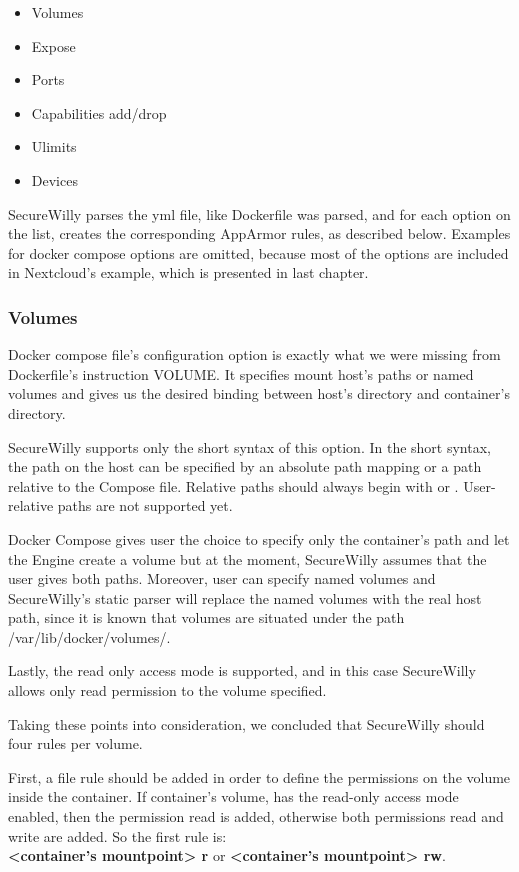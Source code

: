 \begin{itemize}
\item Volumes
\item Expose
\item Ports
\item Capabilities add/drop
\item Ulimits
\item Devices
\end{itemize}

SecureWilly parses the yml file, like Dockerfile was parsed, and for each option on the list, creates the corresponding AppArmor rules, as described below. Examples for docker compose options are omitted, because most of the options are included in Nextcloud's example, which is presented in last chapter.

\subsubsection{Volumes}
Docker compose file's configuration option  is exactly what we were missing from Dockerfile's instruction VOLUME. It specifies mount host's paths or named volumes and gives us the desired binding between host's directory and container's directory.

SecureWilly supports only the short syntax of this option. In the short syntax, the path on the host can be specified by an absolute path mapping or a path relative to the Compose file. Relative paths should always begin with  or . User-relative paths are not supported yet.

Docker Compose gives user the choice to specify only the container's path and let the Engine create a volume but at the moment, SecureWilly assumes that the user gives both paths. Moreover, user can specify named volumes and SecureWilly's static parser will replace the named volumes with the real host path, since it is known that volumes are situated under the path /var/lib/docker/volumes/. 

Lastly, the read only access mode is supported, and in this case SecureWilly allows only read permission to the volume specified.

Taking these points into consideration, we concluded that  SecureWilly should four rules per volume.

First, a file rule should be added in order to define the permissions on the volume inside the container. If container's volume, has the read-only access mode enabled, then the permission read is added, otherwise both permissions read and write are added. So the first rule is: \\\textbf{\textless container's mountpoint\textgreater{} r} or \textbf{\textless container's mountpoint\textgreater{} rw}.


